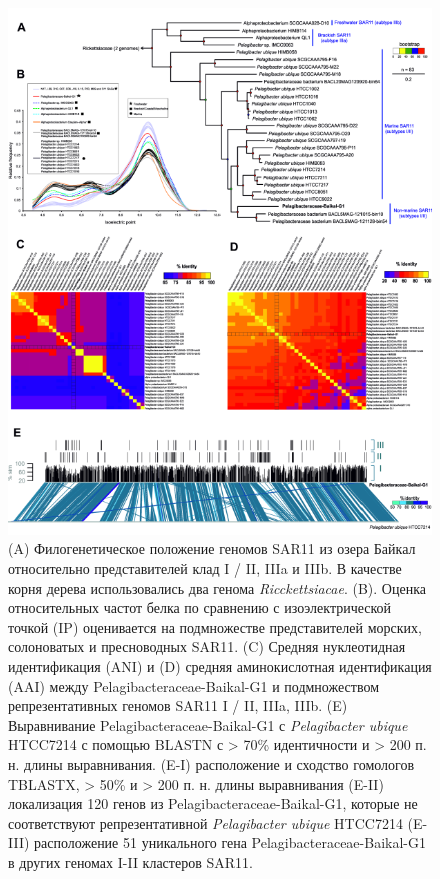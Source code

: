 \documentclass[a4paper,12pt,openany,final]{extreport}
\def\oldcaption{} \let\oldcaption=\caption
\def\caption{\stepcounter{captionsnum}\oldcaption}
\begin{document}
\begin{figure}\centering
  \includegraphics[width=0.9\linewidth]{media/image9.png}
  \caption{(A) Филогенетическое положение геномов SAR11 из озера Байкал
относительно представителей клад I / II, IIIa и IIIb. В качестве корня
дерева использовались два генома \emph{Ricckettsiacae}. (B). Оценка
относительных частот белка по сравнению с изоэлектрической точкой (IP)
оценивается на подмножестве представителей морских, солоноватых и
пресноводных SAR11. (C) Средняя нуклеотидная идентификация (ANI) и (D)
средняя аминокислотная идентификация (AAI) между
Pelagibacteraceae-Baikal-G1 и подмножеством репрезентативных геномов
SAR11 I / II, IIIa, IIIb. (E) Выравнивание Pelagibacteraceae-Baikal-G1 с
\emph{Pelagibacter ubique} HTCC7214 с помощью BLASTN с \textgreater{}
70\% идентичности и \textgreater{} 200 п. н. длины выравнивания. (E-I)
расположение и сходство гомологов TBLASTX, \textgreater{} 50\% и
\textgreater{} 200 п. н. длины выравнивания (E-II) локализация 120 генов
из Pelagibacteraceae-Baikal-G1, которые не соответствуют
репрезентативной \emph{Pelagibacter ubique} HTCC7214 (E- III)
расположение 51 уникального гена Pelagibacteraceae-Baikal-G1 в других
геномах I-II кластеров SAR11.}\label{fig:4-4}
\end{figure}
\end{document}
